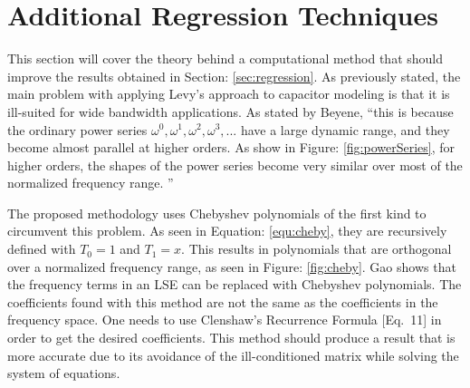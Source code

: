 \section{Additional Regression Techniques}
\label{app:adtl_regression}
\nocite{neu_ModelSynth}
\nocite{cuth_regression}
\nocite{bbc_chebyshev}



This section will cover the theory behind a computational method that should improve the results obtained in Section: \ref{sec:regression}. As previously stated, the main problem with applying Levy's approach to capacitor modeling is that it is ill-suited for wide bandwidth applications. As stated by Beyene, ``this is because the ordinary power series ${\omega ^0, \omega ^1, \omega ^2, \omega ^3,...}$ have a large dynamic range, and they become almost parallel at higher orders. As show in Figure: \ref{fig:powerSeries}, for higher orders, the shapes of the power series become very similar over most of the normalized frequency range. \cite{beyene_uwave}''



The proposed methodology uses Chebyshev polynomials of the first kind to circumvent this problem. As seen in Equation: \eqref{equ:cheby}, they are recursively defined with $T_0 = 1$ and $T_1 = x$. This results in polynomials that are orthogonal over a normalized frequency range, as seen in Figure: \ref{fig:cheby}. Gao\cite{gao_blackBox} shows that the frequency terms in an LSE can be replaced with Chebyshev polynomials. The coefficients found with this method are not the same as the coefficients in the frequency space. One needs to use Clenshaw's Recurrence Formula \cite{gao_blackBox}[Eq.~11] in order to get the desired coefficients. This method should produce a result that is more accurate due to its avoidance of the ill-conditioned matrix while solving the system of equations.




